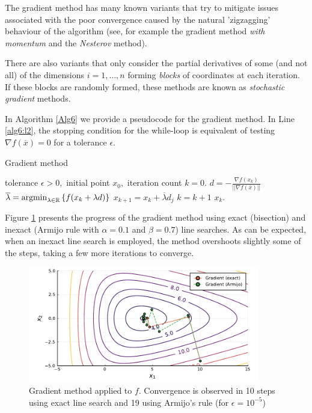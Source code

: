 The gradient method has many known variants that try to mitigate issues associated with the poor convergence caused by the natural 'zigzagging' behaviour of the algorithm (see, for example the gradient method \emph{with momentum} and the \emph{Nesterov} method). 

There are also variants that only consider the partial derivatives of some (and not all) of the dimensions $i = 1, \dots, n$ forming \emph{blocks} of coordinates at each iteration. If these blocks are randomly formed, these methods are known as \emph{stochastic gradient} methods. 

In Algorithm \ref{Alg6} we provide a pseudocode for the gradient method. In Line \ref{alg6:l2}, the stopping condition for the while-loop is equivalent of testing $\nabla f(\overline{x}) = 0$ for a tolerance $\epsilon$. 

\begin{algorithm}[H]
\caption{Gradient method} \label{Alg6}
\begin{algorithmic}[1] %
 tolerance $\epsilon > 0,$ initial point $x_0,$ iteration count $k = 0$. 
 \label{alg6:l2}
        \State $d = -\frac{\nabla f(x_k)}{||\nabla f(\overline{x})||}$
        \State $\overline{\lambda} = \mathop{\rm argmin}_{\lambda \in \mathbb{R}}\left\{ f(x_k + \lambda d) \right \}$
        \State $x_{k+1} = x_k + \overline{\lambda}  d_j$
    \State $k = k+1$    
\EndWhile
{} $x_k$.
\end{algorithmic}
\end{algorithm}

Figure \ref{fig:gradient} presents the progress of the gradient method using exact (bisection) and inexact (Armijo rule with $\alpha =0.1$ and $\beta=0.7$) line searches. As can be expected, when an inexact line search is employed, the method overshoots slightly some of the steps, taking a few more iterations to converge.  

\begin{figure}[h]
\includegraphics[width=0.9\textwidth]{part_2/chapter_5/figures/gradient.pdf}
\caption{Gradient method applied to $f$. Convergence is observed in 10 steps using exact line search and 19 using Armijo's rule (for $\epsilon = 10^{-5}$)} \label{fig:gradient}
\end{figure}


